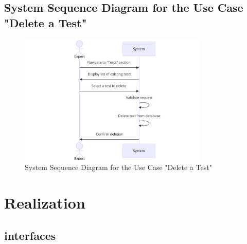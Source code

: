     \subsection{System Sequence Diagram for the Use Case "Delete a Test"}
    \begin{figure}[h!]
        \centering*
        \includegraphics[width=0.8\textwidth]{images/diagram sq .png}
        \caption{System Sequence Diagram for the Use Case "Delete a Test"}
        \label{fig:System Sequence Diagram for the Use Case "Delete a Test"}
    \end{figure}
    \newpage
    \section{Realization}
    \subsection{interfaces}

